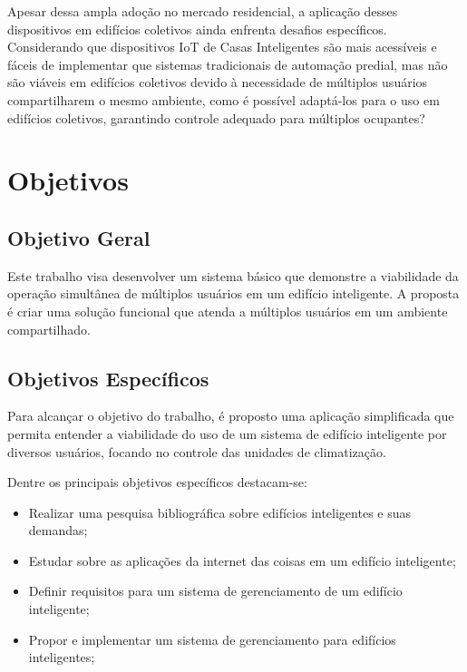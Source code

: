Apesar dessa ampla adoção no mercado residencial, a aplicação desses dispositivos em edifícios coletivos ainda enfrenta desafios específicos.
Considerando que dispositivos IoT de Casas Inteligentes são mais acessíveis e fáceis de implementar que sistemas tradicionais de automação predial,
mas não são viáveis em edifícios coletivos devido à necessidade de múltiplos usuários compartilharem o mesmo ambiente, como é possível adaptá-los
para o uso em edifícios coletivos, garantindo controle adequado para múltiplos ocupantes?


\section{Objetivos}
\subsection{Objetivo Geral}
Este trabalho visa desenvolver um sistema básico que demonstre a viabilidade da operação simultânea de múltiplos usuários
em um edifício inteligente. A proposta é criar uma solução funcional que atenda a múltiplos usuários em um ambiente compartilhado. 

\subsection{Objetivos Específicos}

Para alcançar o objetivo do trabalho, é proposto uma aplicação simplificada que permita entender a viabilidade do uso de um 
sistema de edifício inteligente por diversos usuários, focando no controle das unidades de climatização.

Dentre os principais objetivos específicos destacam-se:

\begin{itemize}
    \item Realizar uma pesquisa bibliográfica sobre edifícios inteligentes e suas demandas;
    \item Estudar sobre as aplicações da internet das coisas em um edifício inteligente;
    \item Definir requisitos para um sistema de gerenciamento de um edifício inteligente;
    \item Propor e implementar um sistema de gerenciamento para edifícios inteligentes;
\end{itemize}

